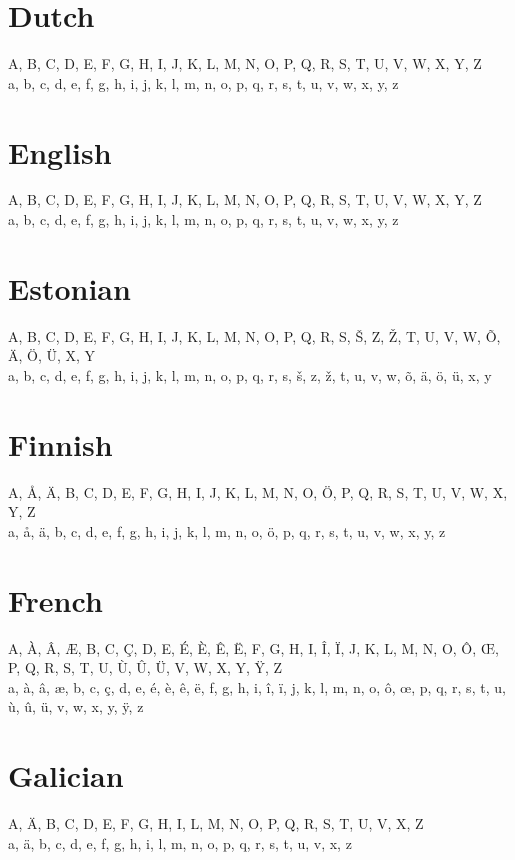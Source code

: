 \documentclass{article}
\begin{document}
\section{Dutch}
A, B, C, D, E, F, G, H, I, J, K, L, M, N, O, P, Q, R, S, T, U, V, W, X, Y, Z \\
a, b, c, d, e, f, g, h, i, j, k, l, m, n, o, p, q, r, s, t, u, v, w, x, y, z

\section{English}
A, B, C, D, E, F, G, H, I, J, K, L, M, N, O, P, Q, R, S, T, U, V, W, X, Y, Z \\
a, b, c, d, e, f, g, h, i, j, k, l, m, n, o, p, q, r, s, t, u, v, w, x, y, z

\section{Estonian}
A, B, C, D, E, F, G, H, I, J, K, L, M, N, O, P, Q, R, S, Š, Z, Ž, T, U, V, W, Õ, Ä, Ö, Ü, X, Y \\
a, b, c, d, e, f, g, h, i, j, k, l, m, n, o, p, q, r, s, š, z, ž, t, u, v, w, õ, ä, ö, ü, x, y

\section{Finnish}
A, Å, Ä, B, C, D, E, F, G, H, I, J, K, L, M, N, O, Ö, P, Q, R, S, T, U, V, W, X, Y, Z \\
a, å, ä, b, c, d, e, f, g, h, i, j, k, l, m, n, o, ö, p, q, r, s, t, u, v, w, x, y, z

\section{French}
A, À, Â, Æ, B, C, Ç, D, E, É, È, Ê, Ë, F, G, H, I, Î, Ï, J, K, L, M, N, O, Ô, Œ, P, Q, R, S, T, U, Ù, Û, Ü, V, W, X, Y, Ÿ, Z \\
a, à, â, æ, b, c, ç, d, e, é, è, ê, ë, f, g, h, i, î, ï, j, k, l, m, n, o, ô, œ, p, q, r, s, t, u, ù, û, ü, v, w, x, y, ÿ, z

\section{Galician}
A, Ä, B, C, D, E, F, G, H, I, L, M, N, O, P, Q, R, S, T, U, V, X, Z \\
a, ä, b, c, d, e, f, g, h, i, l, m, n, o, p, q, r, s, t, u, v, x, z
\end{document}
